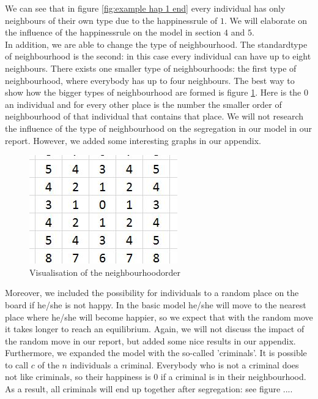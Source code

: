 We can see that in figure \ref{fig:example hap 1 end} every individual has only neighbours of their own type due to the happinessrule of $1$.
We will elaborate on the influence of the happinessrule on the model in section $4$ and $5$.\\

In addition, we are able to change the type of neighbourhood.
The standardtype of neighbourhood is the second: in this case every individual can have up to eight neighbours.
There exists one smaller type of neighbourhoods: the first type of neighbourhood, where everybody has up to four neighbours.
The best way to show how the bigger types of neighbourhood are formed is figure \ref{fig:neighbourhood}.
Here is the $0$ an individual and for every other place is the number the smaller order of neighbourhood of that individual that contains that place.
We will not research the influence of the type of neighbourhood on the segregation in our model in our report.
However, we added some interesting graphs in our appendix.

\begin{figure}[H]
\centering
\includegraphics[scale=0.6]{buurtorde.jpg}
\caption{Visualisation of the neighbourhoodorder}
\label{fig:neighbourhood}
\end{figure}

Moreover, we included the possibility for individuals to a random place on the board if he/she is not happy.
In the basic model he/she will move to the nearest place where he/she will become happier, so we expect that with the random move it takes longer to reach an equilibrium.
Again, we will not discuss the impact of the random move in our report, but added some nice results in our appendix.\\

Furthermore, we expanded the model with the so-called 'criminals'.
It is possible to call $c$ of the $n$ individuals a criminal.
Everybody who is not a criminal does not like criminals, so their happiness is $0$ if a criminal is in their neighbourhood.
As a result, all criminals will end up together after segregation: see figure ....




 







